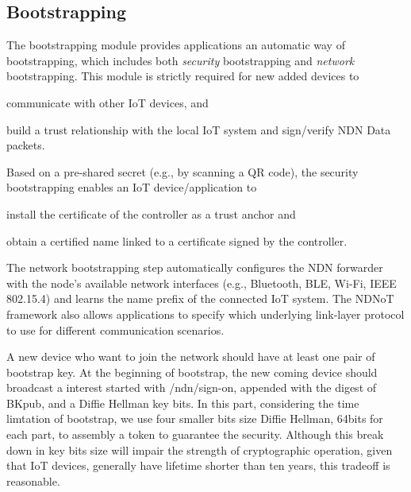 \documentclass[sigconf]{acmart}
\begin{document}
\subsection{Bootstrapping}

The bootstrapping module provides applications an automatic way of bootstrapping, which includes both \emph{security} bootstrapping and \emph{network} bootstrapping. 
This module is strictly required for new added devices to
\begin{enumerate*} [label=(\roman*)]
	\item communicate with other IoT devices,
	and
	\item build a trust relationship with the local IoT system and sign/verify NDN Data packets.
\end{enumerate*}

Based on a pre-shared secret (e.g., by scanning a QR code), the security bootstrapping enables an IoT device/application to
\begin{enumerate*} [label=(\roman*)]
	\item install the certificate of the controller as a trust anchor
	and
	\item obtain a certified name linked to a certificate signed by the controller.
\end{enumerate*}
The network bootstrapping step automatically configures the NDN forwarder with the node's available network interfaces (e.g., Bluetooth, BLE, Wi-Fi, IEEE 802.15.4) and learns the name prefix of the connected IoT system.
The NDNoT framework also allows applications to specify which underlying link-layer protocol to use for different communication scenarios.

A new device who want to join the network should have at least one pair of bootstrap key. At the beginning of bootstrap, the 
new coming device should broadcast a interest started with /ndn/sign-on, appended with the digest of BKpub, and a Diffie Hellman key bits.
In this part, considering the time limtation of bootstrap, we use four smaller bits size Diffie Hellman, 64bits for each part, to assembly 
a token to guarantee the security. Although this break down in key bits size will impair the strength of cryptographic operation, given that IoT 
devices, generally have lifetime shorter than ten years, this tradeoff is reasonable. 
\end{document}
